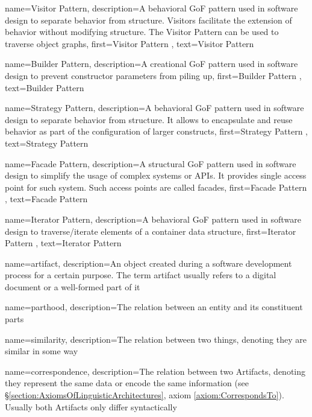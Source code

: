 {
    name={Visitor Pattern},
    description={A behavioral \gls{GoF} pattern used in software design to separate behavior from structure. Visitors facilitate the extension of behavior without modifying structure. The Visitor Pattern can be used to traverse object graphs},
    first={Visitor Pattern \cite{Gamma:1995:DPE:186897}},
    text={Visitor Pattern}
}

{
    name={Builder Pattern},
    description={A creational \gls{GoF} pattern used in software design to prevent constructor parameters from piling up},
    first={Builder Pattern \cite{Gamma:1995:DPE:186897}},
    text={Builder Pattern}
}

{
    name={Strategy Pattern},
    description={A behavioral \gls{GoF} pattern used in software design to separate behavior from structure. It allows to encapsulate and reuse behavior as part of the configuration of larger constructs},
    first={Strategy Pattern \cite{Gamma:1995:DPE:186897}},
    text={Strategy Pattern}
}

{
    name={Facade Pattern},
    description={A structural \gls{GoF} pattern used in software design to simplify the usage of complex systems or \glspl{API}. It provides single access point for such system. Such access points are called facades},
    first={Facade Pattern \cite{Gamma:1995:DPE:186897}},
    text={Facade Pattern}
}


{
    name={Iterator Pattern},
    description={A behavioral \gls{GoF} pattern used in software design to traverse/iterate elements of a container data structure},
    first={Iterator Pattern \cite{Gamma:1995:DPE:186897}},
    text={Iterator Pattern}
}

{
    name={artifact},
    description={An object created during a software development process for a certain purpose. The term artifact usually refers to a digital document or a well-formed part of it}
}

{
    name={parthood},
    description={The relation between an entity and its constituent parts}
}

{
    name={similarity},
    description={The relation between two things, denoting they are similar in some way}
}

{
    name={correspondence},
    description={The relation between two \glspl{Artifact}, denoting they represent the same data or encode the same information (see §\ref{section:AxiomsOfLinguisticArchitectures}, axiom \ref{axiom:CorrespondsTo}). Usually both \glspl{Artifact} only differ syntactically}
}

